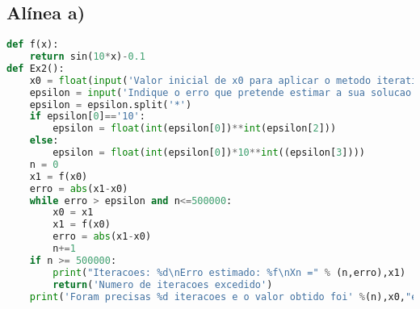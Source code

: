 \documentclass{article}
\begin{document}
\subsection*{Alínea a)}
\begin{lstlisting}[language=Python]
def f(x):
    return sin(10*x)-0.1
def Ex2():
    x0 = float(input('Valor inicial de x0 para aplicar o metodo iterativo simples: '))
    epsilon = input('Indique o erro que pretende estimar a sua solucao: ')
    epsilon = epsilon.split('*')
    if epsilon[0]=='10':
        epsilon = float(int(epsilon[0])**int(epsilon[2]))
    else:
        epsilon = float(int(epsilon[0])*10**int((epsilon[3])))
    n = 0
    x1 = f(x0)
    erro = abs(x1-x0)
    while erro > epsilon and n<=500000:
        x0 = x1
        x1 = f(x0)
        erro = abs(x1-x0)
        n+=1
    if n >= 500000:
        print("Iteracoes: %d\nErro estimado: %f\nXn =" % (n,erro),x1)
        return('Numero de iteracoes excedido')
    print('Foram precisas %d iteracoes e o valor obtido foi' %(n),x0,"erro absoluto:",erro)
\end{lstlisting}
\end{document}
